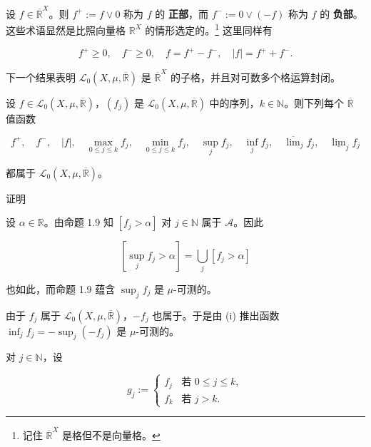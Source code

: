 \begin{example}

设 $ f \in \overline{\mathbb{R}}^X $。则 $ f^{+} := f \vee 0 $ 称为 $ f $ 的 \textbf{正部}，而 $ f^{-} := 0 \vee (-f) $ 称为 $ f $ 的 \textbf{负部}。这些术语显然是比照向量格 $ \mathbb{R}^X $ 的情形选定的。\footnote{记住 $ \overline{\mathbb{R}}^X $ 是格但不是向量格。} 这里同样有

\[
f^{+} \ge 0 , \quad f^{-} \ge 0 , \quad f = f^{+} - f^{-} , \quad |f| = f^{+} + f^{-} .
\]

下一个结果表明 $ \mathcal{L}_0(X,\mu,\overline{\mathbb{R}}) $ 是 $ \overline{\mathbb{R}}^X $ 的子格，并且对可数多个格运算封闭。

\end{example}

\begin{proposition}

设 $ f \in \mathcal{L}_0(X,\mu,\overline{\mathbb{R}}) $，$ (f_j) $ 是 $ \mathcal{L}_0(X,\mu,\overline{\mathbb{R}}) $ 中的序列，$ k \in \mathbb{N} $。则下列每个 $ \overline{\mathbb{R}} $ 值函数

\[
f^{+} , \quad f^{-} , \quad |f| , \quad \max_{0 \le j \le k} f_j , \quad \min_{0 \le j \le k} f_j , \quad \sup_j f_j , \quad \inf_j f_j , \quad \overline{\lim}_j f_j , \quad \underline{\lim}_j f_j
\]

都属于 $ \mathcal{L}_0(X,\mu,\overline{\mathbb{R}}) $。

证明

\begin{subitems}
\item

设 $ \alpha \in \mathbb{R} $。由命题 1.9 知 $ [f_j > \alpha] $ 对 $ j \in \mathbb{N} $ 属于 $ \mathcal{A} $。因此

\[
[\sup_j f_j > \alpha] = \bigcup_j [f_j > \alpha]
\]

也如此，而命题 1.9 蕴含 $ \sup_j f_j $ 是 $ \mu $-可测的。

\item

由于 $ f_j $ 属于 $ \mathcal{L}_0(X,\mu,\overline{\mathbb{R}}) $，$ -f_j $ 也属于。于是由 (i) 推出函数 $ \inf_j f_j = -\sup_j(-f_j) $ 是 $ \mu $-可测的。

\item

对 $ j \in \mathbb{N} $，设

\begin{equation*}
g_j := \begin{cases} f_j & \text{若 } 0 \le j \le k , \\ f_k & \text{若 } j > k . \end{cases}
\end{equation*}


\end{subitems}
\end{proposition}
